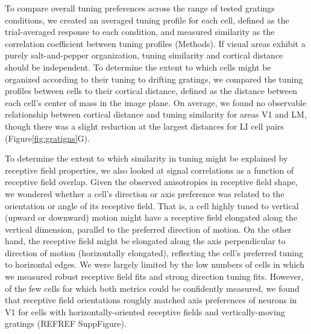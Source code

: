 To compare overall tuning preferences across the range of tested gratings conditions, we created an averaged tuning profile for each cell, defined as the trial-averaged response to each condition, and measured similarity as the correlation coefficient between tuning profiles (Methods). If visual areas exhibit a purely salt-and-pepper organization, tuning similarity and cortical distance should be independent. To determine the extent to which cells might be organized according to their tuning to drifting gratings, we compared the tuning profiles between cells to their cortical distance, defined as the distance between each cell’s center of mass in the image plane. On average, we found no observable relationship between cortical distance and tuning similarity for areas V1 and LM, though there was a slight reduction at the largest distances for LI cell pairs (Figure\ref{fig:gratigns}G). 

To determine the extent to which similarity in tuning might be explained by receptive field properties, we also looked at signal correlations as a function of receptive field overlap. Given the observed anisotropies in receptive field shape, we wondered whether a cell's direction or axis preference was related to the orientation or angle of its receptive field. That is, a cell highly tuned to vertical (upward or downward) motion might have a receptive field elongated along the vertical dimension, parallel to the preferred direction of motion. On the other hand, the receptive field might be elongated along the axis perpendicular to direction of motion (horizontally elongated), reflecting the cell's preferred tuning to horizontal edges. We were largely limited by the low numbers of cells in which we measured robust receptive field fits and strong direction tuning fits. However, of the few cells for which both metrics could be confidently measured, we found that receptive field orientations roughly matched axis preferences of neurons in V1 for cells with horizontally-oriented receptive fields and vertically-moving gratings (REFREF SuppFigure). 




